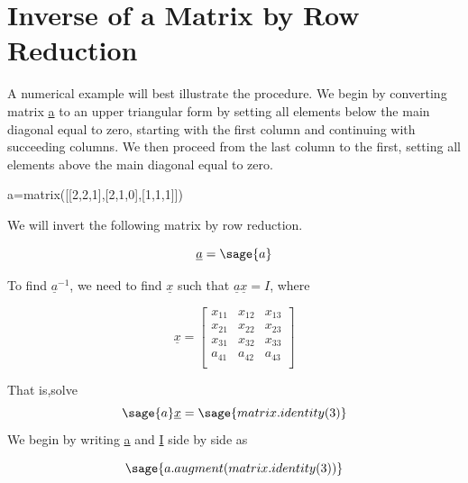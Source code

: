 \documentclass[12pt]{report}
\begin{document}

\section{Inverse of a Matrix by Row Reduction}\label{last}

A numerical example will best illustrate the procedure. We begin by
converting matrix \underline{a} to an upper triangular form by setting
all elements below the main diagonal equal to zero, starting with the
first column and continuing with succeeding columns. We then proceed
from the last column to the first, setting all elements above the main
diagonal equal to zero.

\begin{sagesilent}
	a=matrix([[2,2,1],[2,1,0],[1,1,1]])
\end{sagesilent}
We will invert the following matrix by row reduction.

\begin{equation}
	\underline{a} = \sage{a}
\end{equation}

To find $\underline{a}^{-1}$, we need to find $\underline{x}$ such that
$\underline{a}\underline{x}=I$, where

\begin{equation}
	\underline{x}=\left[\begin{array}{rrr}
	x_{11} & x_{12} & x_{13} \\
	x_{21} & x_{22} & x_{23} \\
	x_{31} & x_{32} & x_{33} \\
	a_{41} & a_{42} & a_{43}  \\
	\end{array}\right]
\end{equation}

That is,solve\begin{equation} \sage{a}\underline{x} = \sage{matrix.identity(3)}\end{equation}
We begin by writing \underline{a} and \underline{I} side by side as

\begin{equation}
	\sage{a.augment(matrix.identity(3))}
	\label{eq:inv1}
\end{equation}
\end{document}
